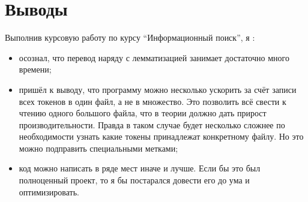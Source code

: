 \section{Выводы}

Выполнив курсовую работу по курсу \enquote{Информационный поиск}, я :
\begin{itemize}
    \item осознал, что перевод наряду с лемматизацией занимает достаточно много времени;
    \item пришёл к выводу, что программу можно несколько ускорить за счёт записи всех токенов в один файл, а не в множество. Это позволить всё свести к чтению одного большого файла, что в теории должно дать прирост производительности. Правда в таком случае будет несколько сложнее по необходимости узнать какие токены принадлежат конкретному файлу. Но это можно подправить специальными метками;
    \item код можно написать в ряде мест иначе и лучше. Если бы это был полноценный проект, то я бы постарался довести его до ума и оптимизировать.
\end{itemize}
\pagebreak
